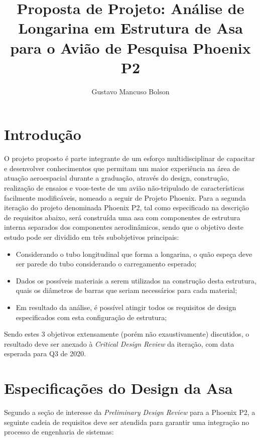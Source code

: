 \documentclass[a4paper]{article}
\title{\Large{\textbf{Proposta de Projeto: Análise de Longarina em Estrutura de Asa para o Avião de Pesquisa Phoenix P2}}}
\author{Gustavo Mancuso Bolson}%
\begin{document}
\maketitle

\section{Introdução}

O projeto proposto é parte integrante de um esforço multidisciplinar de capacitar e desenvolver conhecimentos que permitam um maior experiência na área de atuação aeroespacial durante a graduação, através do design, construção, realização de ensaios e voos-teste de um avião não-tripulado de características facilmente modificáveis, nomeado a seguir de Projeto Phoenix. Para a segunda iteração do projeto denominada Phoenix P2, tal como especificado na descrição de requisitos abaixo, será construída uma asa com componentes de estrutura interna separados dos componentes aerodinâmicos, sendo que o objetivo deste estudo pode ser dividido em três subobjetivos principais:

\begin{itemize}
    \item Considerando o tubo longitudinal que forma a longarina, o quão espeça deve ser parede do tubo considerando o carregamento esperado;
    \item Dados os possíveis materiais a serem utilizados na construção desta estrutura, quais os diâmetros de barras que seriam necessários para cada material;
    \item Em resultado da análise, é possível atingir todos os requisitos de design especificados com esta configuração de estrutura;
\end{itemize}

Sendo estes 3 objetivos extensamente (porém não exaustivamente) discutidos, o resultado deve ser anexado à \textit{Critical Design Review} da iteração, com data esperada para Q3 de 2020.

\section{Especificações do Design da Asa}

Segundo a seção de interesse da \textit{Preliminary Design Review} para a Phoenix P2, a seguinte cadeia de requisitos deve ser atendida para garantir uma integração no processo de engenharia de sistemas:
\end{document}
